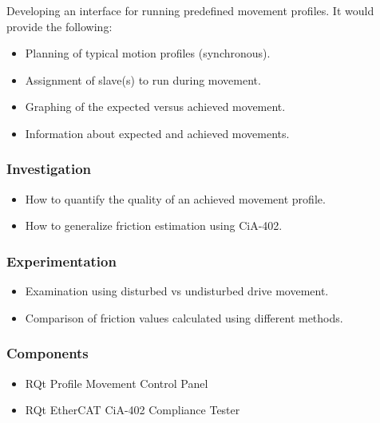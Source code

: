 \noindent
Developing an interface for running predefined movement profiles. It would provide the following:

\begin{itemize}[nosep]
	\item Planning of typical motion profiles (synchronous). 
	\item Assignment of slave(s) to run during movement. 
	\item Graphing of the expected versus achieved movement. 
	\item Information about expected and achieved movements.
\end{itemize}

\subsubsection{Investigation}

\begin{itemize}[nosep]
	\item How to quantify the quality of an achieved movement profile.  
	\item How to generalize friction estimation using CiA-402.  
\end{itemize}

\subsubsection{Experimentation}

\begin{itemize}[nosep]
	\item Examination using disturbed vs undisturbed drive movement.  
	\item Comparison of friction values calculated using different methods.  
\end{itemize}

\subsubsection{Components}

\begin{itemize}[nosep]
	\item RQt Profile Movement Control Panel
	\item RQt EtherCAT CiA-402 Compliance Tester
\end{itemize}
